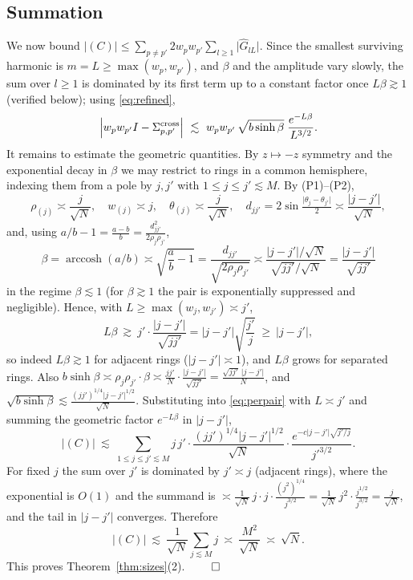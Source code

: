 \documentclass[11pt,reqno]{amsart}
\theoremstyle{definition}
\DeclareMathOperator{\arccosh}{arccosh}
\newcommand{\abs}[1]{\lvert #1\rvert}
\newcommand{\rp}{\rho}
\newcommand{\lesss}{\lesssim}
\begin{document}
\subsection{Summation}
We now bound $\abs{(C)}\le\sum_{p\ne p'}2w_pw_{p'}\sum_{l\ge1}\abs{\widehat G_{lL}}$. Since the
smallest surviving harmonic is $m=L\ge\max(w_p,w_{p'})$, and $\beta$ and the amplitude vary slowly,
the sum over $l\ge1$ is dominated by its first term up to a constant factor once $L\beta\gtrsim1$
(verified below); using \eqref{eq:refined},
\begin{equation}\label{eq:perpair}
   \Bigl\lvert w_pw_{p'}I-\Sigma_{p,p'}^{\mathrm{cross}}\Bigr\rvert
   \ \lesss\ w_pw_{p'}\,\sqrt{b\sinh\beta}\;\frac{e^{-L\beta}}{L^{3/2}} .
\end{equation}
It remains to estimate the geometric quantities. By $z\mapsto-z$ symmetry and the exponential decay
in $\beta$ we may restrict to rings in a common hemisphere, indexing them from a pole by $j,j'$ with
$1\le j\le j'\lesssim M$. By (P1)--(P2),
\[
   \rp_{(j)}\asymp\frac{j}{\sqrt N},\quad w_{(j)}\asymp j,\quad
   \theta_{(j)}\asymp\frac{j}{\sqrt N},\quad
   d_{jj'}=2\sin\tfrac{\abs{\theta_j-\theta_{j'}}}{2}\asymp\frac{\abs{j-j'}}{\sqrt N},
\]
and, using $a/b-1=\frac{a-b}{b}=\frac{d_{jj'}^2}{2\rp_j\rp_{j'}}$,
\[
   \beta=\arccosh(a/b)\asymp\sqrt{\frac{a}{b}-1}=\frac{d_{jj'}}{\sqrt{2\rp_j\rp_{j'}}}
   \asymp\frac{\abs{j-j'}/\sqrt N}{\sqrt{jj'}/\sqrt N}=\frac{\abs{j-j'}}{\sqrt{jj'}}
\]
in the regime $\beta\lesssim1$ (for $\beta\gtrsim1$ the pair is exponentially suppressed and
negligible). Hence, with $L\ge\max(w_j,w_{j'})\asymp j'$,
\[
   L\beta\ \gtrsim\ j'\cdot\frac{\abs{j-j'}}{\sqrt{jj'}}=\abs{j-j'}\sqrt{\frac{j'}{j}}\ \ge\ \abs{j-j'},
\]
so indeed $L\beta\gtrsim1$ for adjacent rings ($\abs{j-j'}\asymp1$), and $L\beta$ grows for separated
rings. Also $b\sinh\beta\asymp \rp_j\rp_{j'}\cdot\beta\asymp\frac{jj'}{N}\cdot\frac{\abs{j-j'}}{\sqrt{jj'}}
=\frac{\sqrt{jj'}\,\abs{j-j'}}{N}$, and $\sqrt{b\sinh\beta}\lesss\frac{(jj')^{1/4}\abs{j-j'}^{1/2}}{\sqrt N}$.
Substituting into \eqref{eq:perpair} with $L\asymp j'$ and summing the geometric factor
$e^{-L\beta}$ in $\abs{j-j'}$,
\[
   \abs{(C)}\ \lesss\ \sum_{1\le j\le j'\lesssim M}
      j\,j'\cdot\frac{(jj')^{1/4}\abs{j-j'}^{1/2}}{\sqrt N}\cdot\frac{e^{-c\abs{j-j'}\sqrt{j'/j}}}{j'^{3/2}} .
\]
For fixed $j$ the sum over $j'$ is dominated by $j'\asymp j$ (adjacent rings), where the exponential
is $O(1)$ and the summand is
$\asymp\frac{1}{\sqrt N}\,j\cdot j\cdot\frac{(j^2)^{1/4}}{j^{3/2}}=\frac{1}{\sqrt N}\,j^{2}\cdot
\frac{j^{1/2}}{j^{3/2}}=\frac{j}{\sqrt N}$, and the tail in $\abs{j-j'}$ converges. Therefore
\[
   \abs{(C)}\ \lesss\ \frac{1}{\sqrt N}\sum_{j\lesssim M}j\ \asymp\ \frac{M^2}{\sqrt N}\ \asymp\ \sqrt N .
\]
This proves Theorem~\ref{thm:sizes}(2). $\qed$
\end{document}
